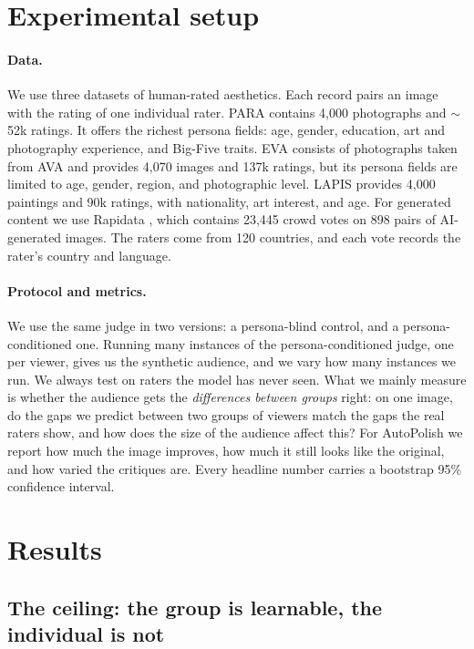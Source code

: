 \documentclass{article}
\begin{document}
\section{Experimental setup}

\paragraph{Data.} We use three datasets of human-rated aesthetics. Each record pairs an image with the rating of one individual rater. PARA \citep{yang2022para} contains 4{,}000 photographs and $\sim$52k ratings. It offers the richest persona fields: age, gender, education, art and photography experience, and Big-Five traits. EVA \citep{kang2020eva} consists of photographs taken from AVA \citep{murray2012ava} and provides 4{,}070 images and 137k ratings, but its persona fields are limited to age, gender, region, and photographic level. LAPIS \citep{maerten2025lapis} provides 4{,}000 paintings and 90k ratings, with nationality, art interest, and age. For generated content we use Rapidata \citep{rapidata2024}, which contains 23{,}445 crowd votes on 898 pairs of AI-generated images. The raters come from 120 countries, and each vote records the rater's country and language.

\paragraph{Protocol and metrics.} We use the same judge in two versions: a persona-blind control, and a persona-conditioned one. Running many instances of the persona-conditioned judge, one per viewer, gives us the synthetic audience, and we vary how many instances we run. We always test on raters the model has never seen. What we mainly measure is whether the audience gets the \emph{differences between groups} right: on one image, do the gaps we predict between two groups of viewers match the gaps the real raters show, and how does the size of the audience affect this? For AutoPolish we report how much the image improves, how much it still looks like the original, and how varied the critiques are. Every headline number carries a bootstrap 95\% confidence interval.


\section{Results}

\subsection{The ceiling: the group is learnable, the individual is not}
\label{sec:ceiling}
\end{document}
